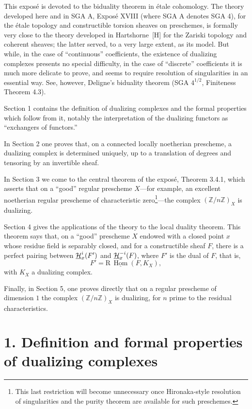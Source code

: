 \documentclass[11pt]{article}
\theoremstyle{plain}
\theoremstyle{definition}
\theoremstyle{remark}
\newcommand{\ZZ}{\mathbb Z}
\DeclareMathOperator{\Hom}{Hom}
\newcommand{\R}{\mathrm R}
\begin{document}
This exposé is devoted to the biduality theorem in étale cohomology. The theory developed here and in SGA A, Exposé XVIII (where SGA A denotes SGA 4), for the étale topology and constructible torsion sheaves on preschemes, is formally very close to the theory developed in Hartshorne~[H] for the Zariski topology and coherent sheaves; the latter served, to a very large extent, as its model. But while, in the case of ``continuous'' coefficients, the existence of dualizing complexes presents no special difficulty, in the case of ``discrete'' coefficients it is much more delicate to prove, and seems to require resolution of singularities in an essential way. See, however, Deligne's biduality theorem (SGA $4^{1/2}$, Finiteness Theorem 4.3).

Section 1 contains the definition of dualizing complexes and the formal properties which follow from it, notably the interpretation of the dualizing functors as ``exchangers of functors.''

In Section 2 one proves that, on a connected locally noetherian prescheme, a dualizing complex is determined uniquely, up to a translation of degrees and tensoring by an invertible sheaf.

In Section 3 we come to the central theorem of the exposé, Theorem 3.4.1, which asserts that on a ``good'' regular prescheme $X$---for example, an excellent noetherian regular prescheme of characteristic zero\footnote{This last restriction will become unnecessary once Hironaka-style resolution of singularities and the purity theorem are available for such preschemes.}---the complex $(\ZZ/n\ZZ)_X$ is dualizing.

Section 4 gives the applications of the theory to the local duality theorem. This theorem says that, on a ``good'' prescheme $X$ endowed with a closed point $x$ whose residue field is separably closed, and for a constructible sheaf $F$, there is a perfect pairing between $\underline{\mathcal H}^i_x(F')$ and $\underline{\mathcal H}^{-i}_x(F)$, where $F'$ is the dual of $F$, that is,
\[
   F'=\R\,\underline{\Hom}(F,K_X),
\]
with $K_X$ a dualizing complex.

Finally, in Section 5, one proves directly that on a regular prescheme of dimension $1$ the complex $(\ZZ/n\ZZ)_X$ is dualizing, for $n$ prime to the residual characteristics.

\section*{1. Definition and formal properties of dualizing complexes}
\end{document}
